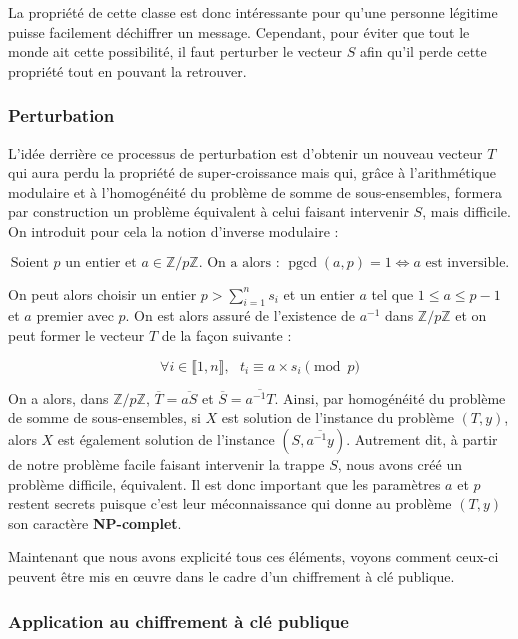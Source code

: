 \documentclass[a4paper,10pt]{article}
\newcommand{\pgcd}{\mathop{\mathrm{pgcd}}\nolimits}
\begin{document}
La propriété de cette classe est donc intéressante pour qu'une personne légitime puisse facilement déchiffrer un message. Cependant, pour éviter que tout le monde ait cette possibilité, il faut perturber le vecteur $S$ afin qu'il perde cette propriété tout en pouvant la retrouver.

\subsubsection{Perturbation}
\label{clés}

L'idée derrière ce processus de perturbation est d'obtenir un nouveau vecteur $T$ qui aura perdu la propriété de super-croissance mais qui, grâce à l'arithmétique modulaire et à l'homogénéité du problème de somme de sous-ensembles, formera par construction un problème équivalent à celui faisant intervenir $S$, mais difficile. On introduit pour cela la notion d'inverse modulaire : 

$$\text{Soient } p \text { un entier et } a \in \mathbb{Z}/p\mathbb{Z} \text{. On a alors : } \pgcd(a,p) = 1 \Leftrightarrow a \text{ est inversible.}$$

On peut alors choisir un entier $p > \sum \limits_{{i=1}}^{n} s_i$ et un entier $a$ tel que $1\leq a \leq p-1$ et $a$ premier avec $p$. On est alors assuré de l'existence de $a^{-1}$ dans $\mathbb{Z}/p\mathbb{Z}$ et on peut former le vecteur $T$ de la façon suivante : 

$$\forall i \in \llbracket 1, n \rrbracket,\text{ } t_i \equiv a \times s_i \pmod p$$

On a alors, dans $\mathbb{Z}/p\mathbb{Z}$, $\overline{T} = \overline{aS}$ et $\overline{S} = \overline{a^{-1}T}$. Ainsi, par homogénéité du problème de somme de sous-ensembles, si $X$ est solution de l'instance du problème $(T, y)$, alors $X$ est également solution de l'instance $(S, \overline{a^{-1}y})$. Autrement dit, à partir de notre problème facile faisant intervenir la trappe $S$, nous avons créé un problème difficile, équivalent. Il est donc important que les paramètres $a$ et $p$ restent secrets puisque c'est leur méconnaissance qui donne au problème $(T, y)$ son caractère \textbf{NP-complet}.

Maintenant que nous avons explicité tous ces éléments, voyons comment ceux-ci peuvent être mis en œuvre dans le cadre d'un chiffrement à clé publique.

\subsubsection{Application au chiffrement à clé publique}
\end{document}
